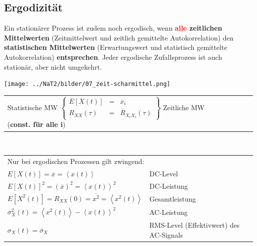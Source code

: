
\subsection{Ergodizität }
Ein stationärer Prozess ist zudem noch ergodisch, wenn \textbf{\textcolor{red}{alle} zeitlichen
Mittelwerten} (Zeitmittelwert und zeitlich gemittelte Autokorrelation) den \textbf{statistischen
Mittelwerten} (Erwartungswert und statistisch gemittelte Autokorrelation)
\textbf{entsprechen}. Jeder ergodische Zufallsprozess ist auch stationär, aber
nicht umgekehrt.


	\begin{minipage}{5cm}
		\texttt{[image: ../NaT2/bilder/07\_zeit-scharmittel.png]}
  	\end{minipage}
	\begin{minipage}{13.5cm}
	\begin{tabular}{llll}  
    	Statistische MW $ \left\{
    	\begin{array}{ccc}
       		E[X(t)] & = & \overline{x}_i \\
       		R_{XX}(\tau) & = & \overline{R}_{X_iX_i}(\tau)
       \end{array}
		\right\} $
		Zeitliche MW (\textbf{const. für alle i})
    \end{tabular} \\

	\begin{tabular}{ll}
  		\multicolumn{2}{l}{Nur bei ergodischen Prozessen gilt zwingend:} \\
      $E[X(t)] = \overline{x} = \left\langle x(t) \right\rangle$ & DC-Level \\
      $E[X(t)]^{2} = (\overline{x})^{2} = \left\langle x(t) \right\rangle^{2}$ & DC-Leistung \\
      $E[X^{2}(t)] = R_{XX}(0) = \overline{x^{2}} = 
                     \left\langle x^{2}(t) \right\rangle $ & Gesamtleistung \\
      $\sigma_{X}^{2}(t) = \left\langle x^{2}(t) \right\rangle 
                           - \left\langle x(t) \right\rangle^{2}$ & AC-Leistung \\
      $\sigma_{X}(t) = \overline{\sigma}_{X}$ & RMS-Level (Effektivwert) des AC-Signals\\
    \end{tabular}
  	\end{minipage}



